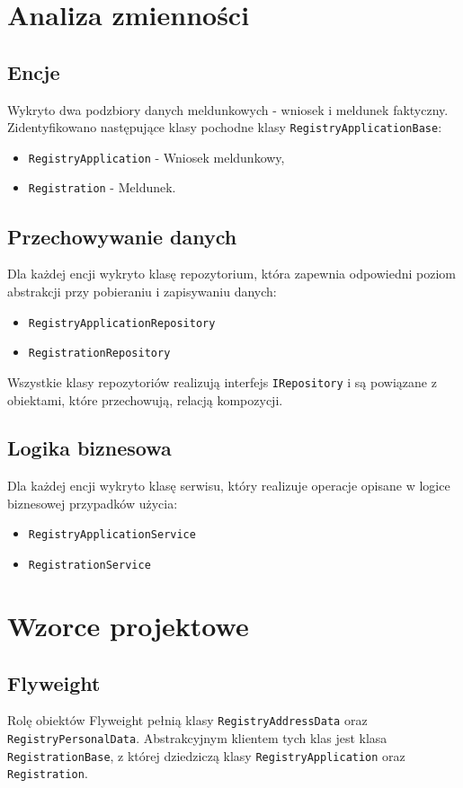 \documentclass[12pt]{article}
\begin{document}
\section{Analiza zmienności}
\subsection{Encje}
Wykryto dwa podzbiory danych meldunkowych - wniosek i meldunek faktyczny.
Zidentyfikowano następujące klasy pochodne klasy \lstinline{RegistryApplicationBase}: 
\begin{itemize}[noitemsep]
    \item \lstinline{RegistryApplication} - Wniosek meldunkowy,
    \item \lstinline{Registration} - Meldunek.
\end{itemize}

\subsection{Przechowywanie danych}
Dla każdej encji wykryto klasę repozytorium, która zapewnia odpowiedni poziom abstrakcji przy pobieraniu i zapisywaniu danych:
\begin{itemize}[noitemsep]
    \item \lstinline{RegistryApplicationRepository}
    \item \lstinline{RegistrationRepository}
\end{itemize}
Wszystkie klasy repozytoriów realizują interfejs \lstinline{IRepository} i są powiązane z obiektami, które przechowują, relacją kompozycji.

\subsection{Logika biznesowa}
Dla każdej encji wykryto klasę serwisu, który realizuje operacje opisane w logice biznesowej przypadków użycia:
\begin{itemize}[noitemsep]
    \item \lstinline{RegistryApplicationService}
    \item \lstinline{RegistrationService}
\end{itemize}


\section{Wzorce projektowe}
\subsection{Flyweight}
Rolę obiektów Flyweight pełnią klasy \lstinline{RegistryAddressData} oraz \lstinline{RegistryPersonalData}. Abstrakcyjnym klientem tych klas jest klasa \lstinline{RegistrationBase}, z której dziedziczą klasy \lstinline{RegistryApplication} oraz \lstinline{Registration}.
\end{document}
